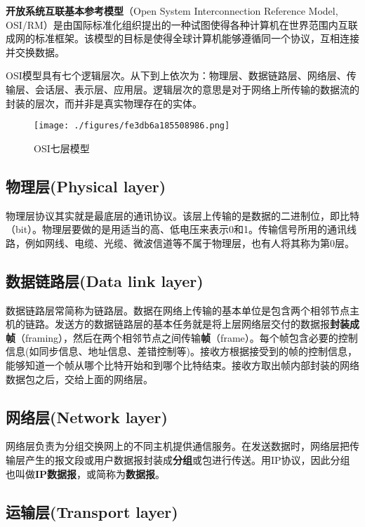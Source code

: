 
\textbf{开放系统互联基本参考模型}（Open System Interconnection Reference Model, OSI/RM）是由国际标准化组织提出的一种试图使得各种计算机在世界范围内互联成网的标准框架。该模型的目标是使得全球计算机能够遵循同一个协议，互相连接并交换数据。

OSI模型具有七个逻辑层次。从下到上依次为：物理层、数据链路层、网络层、传输层、会话层、表示层、应用层。逻辑层次的意思是对于网络上所传输的数据流的封装的层次，而并非是真实物理存在的实体。
\begin{figure}[ht]
\centering
\texttt{[image: ./figures/fe3db6a185508986.png]}
\caption{OSI七层模型} \label{fig_OSIRM_1}
\end{figure}

\subsection{物理层(Physical layer)}

物理层协议其实就是最底层的通讯协议。该层上传输的是数据的二进制位，即比特（bit）。物理层要做的是用适当的高、低电压来表示0和1。传输信号所用的通讯线路，例如网线、电缆、光缆、微波信道等不属于物理层，也有人将其称为第0层。

\subsection{数据链路层(Data link layer)}

数据链路层常简称为链路层。数据在网络上传输的基本单位是包含两个相邻节点主机的链路。发送方的数据链路层的基本任务就是将上层网络层交付的数据报\textbf{封装成帧}（framing），然后在两个相邻节点之间传输\textbf{帧}（frame）。每个帧包含必要的控制信息(如同步信息、地址信息、差错控制等)。接收方根据接受到的帧的控制信息，能够知道一个帧从哪个比特开始和到哪个比特结束。接收方取出帧内部封装的网络数据包之后，交给上面的网络层。

\subsection{网络层(Network layer)}
网络层负责为分组交换网上的不同主机提供通信服务。在发送数据时，网络层把传输层产生的报文段或用户数据报封装成\textbf{分组}或包进行传送。用IP协议，因此分组也叫做\textbf{IP数据报}，或简称为\textbf{数据报}。

\subsection{运输层(Transport layer)}

